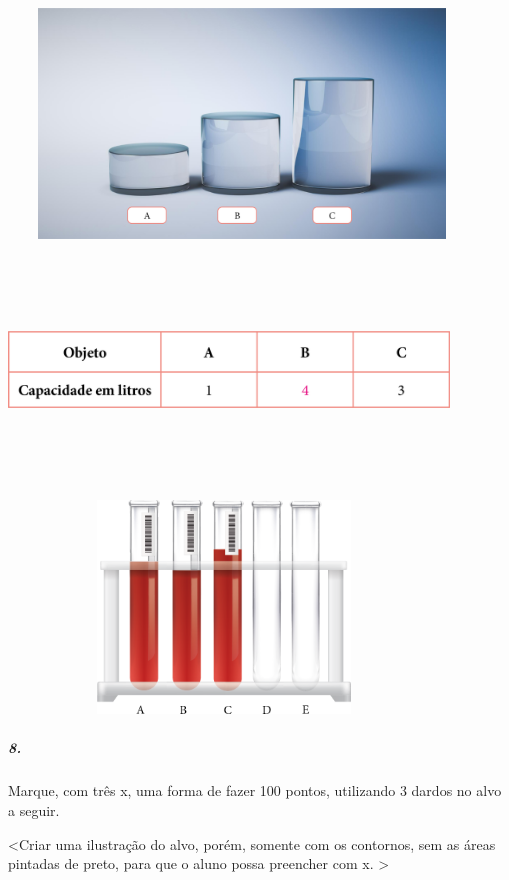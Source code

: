 \includegraphics[width=4.87500in,height=2.40625in]{media/image34.png}

\includegraphics[width=4.60417in,height=2.33333in]{media/image35.png}

\includegraphics[width=4.50000in,height=2.22917in]{media/image36.png}

\subparagraph{8.}\label{section-21}

Marque, com três x, uma forma de fazer 100 pontos, utilizando 3 dardos no alvo a seguir.

\textless{}Criar uma ilustração do alvo, porém, somente com os
contornos, sem as áreas pintadas de preto, para que o aluno possa
preencher com x. \textgreater{}

